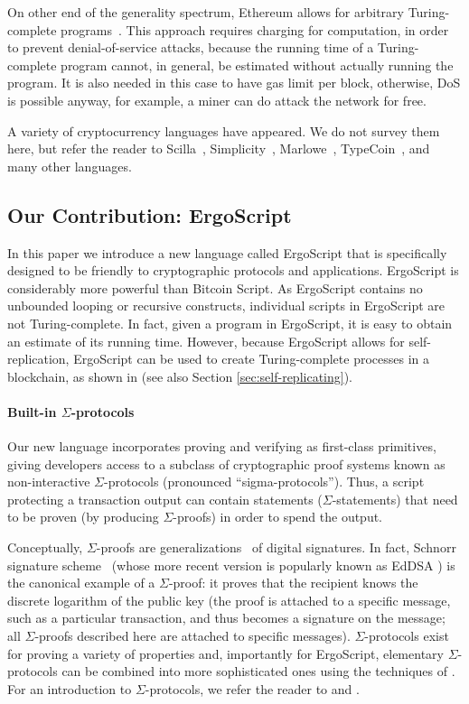 \documentclass[11pt]{article}
\newcommand{\langname}{ErgoScript\xspace}
\begin{document}
On other end of the generality spectrum, Ethereum allows for arbitrary Turing-complete programs~\cite{wood2014ethereum}. This approach requires charging for computation, in order to prevent denial-of-service attacks, because the running time of a Turing-complete program cannot, in general, be estimated without actually running the program. It is also needed in this case to have gas limit per block, otherwise, DoS is possible anyway, for example, a miner can do attack the network for free.

A variety of cryptocurrency languages have appeared. We do not survey them here, but refer the reader to Scilla~\cite{Scilla},
Simplicity~\cite{o2017simplicity}, Marlowe~\cite{seijas2018marlowe}, TypeCoin~\cite{crary2015peer}, and many other languages.

\subsection{Our Contribution: \langname}
In this paper we introduce a new language called \langname that is specifically designed to be friendly to cryptographic protocols and applications. \langname is considerably more powerful than Bitcoin Script. As \langname contains no unbounded looping or recursive constructs, individual scripts in \langname are not Turing-complete.  In fact, given a program in \langname, it is easy to obtain an estimate of its running time. However, because \langname allows for self-replication, \langname can be used to create Turing-complete processes in a blockchain, as shown in \cite{CKM18} (see also Section \ref{sec:self-replicating}).


\paragraph{Built-in $\Sigma$-protocols}

Our new language incorporates proving and verifying as first-class primitives, giving developers access to a subclass of cryptographic proof systems known as non-interactive $\Sigma$-protocols (pronounced ``sigma-protocols'').   Thus, a script protecting a transaction output can contain statements ($\Sigma$-statements) that need to be proven (by producing $\Sigma$-proofs) in order to spend the output.

Conceptually, $\Sigma$-proofs \cite{Cra96} are generalizations~\cite{CL06} of digital signatures.
In fact, Schnorr signature scheme~\cite{Sch91} (whose more recent version is popularly known as EdDSA \cite{BDLSY12,rfc8032}) is the canonical example of a $\Sigma$-proof: it proves that the recipient knows the discrete logarithm of the public key (the proof is attached to a specific message, such as a particular transaction, and thus becomes a signature on the message; all $\Sigma$-proofs described here are attached to specific messages). $\Sigma$-protocols exist for proving a variety of properties and, importantly for \langname, elementary $\Sigma$-protocols can be combined into more sophisticated ones using the techniques of \cite{CDS94}. For an introduction to $\Sigma$-protocols, we refer the reader to \cite{Dam10} and \cite[Chapter 6]{HL10}.
\end{document}
